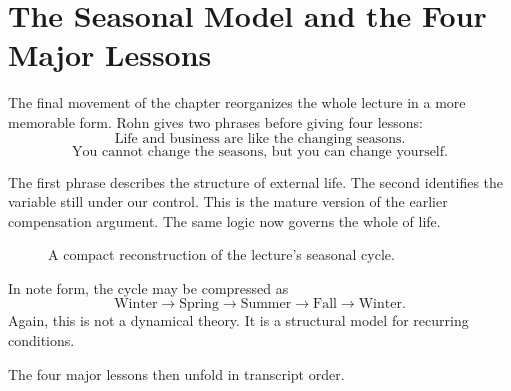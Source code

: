 \section{The Seasonal Model and the Four Major Lessons}

The final movement of the chapter reorganizes the whole lecture in a more memorable form. Rohn gives two phrases before giving four lessons:
\begin{equation}
\text{Life and business are like the changing seasons.}
\end{equation}
\begin{equation}
\text{You cannot change the seasons, but you can change yourself.}
\end{equation}

The first phrase describes the structure of external life. The second identifies the variable still under our control. This is the mature version of the earlier compensation argument. The same logic now governs the whole of life.

\begin{figure}[t]
\centering
{}
\caption{A compact reconstruction of the lecture's seasonal cycle.}
\end{figure}

In note form, the cycle may be compressed as
\begin{equation}
\text{Winter} \to \text{Spring} \to \text{Summer} \to \text{Fall} \to \text{Winter}.
\end{equation}
Again, this is not a dynamical theory. It is a structural model for recurring conditions.

The four major lessons then unfold in transcript order.

